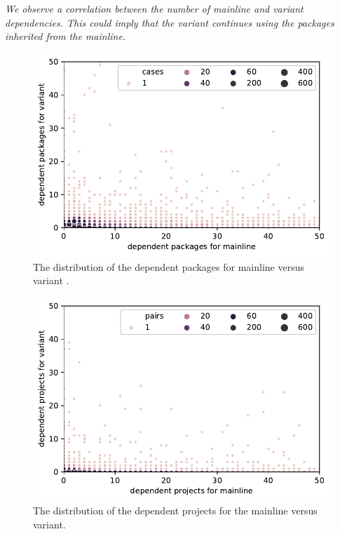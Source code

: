 \begin{framed} 
\noindent
\emph{We observe a correlation between the number of mainline and variant dependencies. This could imply that the variant continues using the packages inherited from the mainline.}
\end{framed}

\begin{figure}[htbp]
\vspace{-.3cm}
   \centering
    \includegraphics[scale=0.5]{figures/dependents.pdf}
    \caption{The distribution of the dependent packages for mainline versus variant .}
    \label{fig:depsPackages}
\end{figure}

\begin{figure}[htbp]
\vspace{-.3cm}
   \centering
    \includegraphics[scale=0.5]{figures/benevolj_projects.pdf}
    \caption{The distribution of the dependent projects for the mainline versus variant.}
    \label{fig:depsProjects}
\end{figure}

